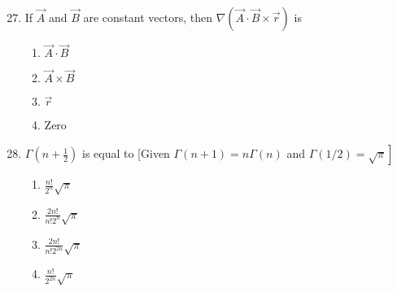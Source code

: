 \documentclass[journal]{IEEEtran}
\begin{document}
\begin{enumerate}
		\setcounter{enumi}{26}

 
    \item If $\vec{A}$ and $\vec{B}$ are constant vectors, then $\nabla(\vec{A} \cdot \vec{B} \times \vec{r})$ is
   
   \begin{multicols}{4}
			\begin{enumerate}

\item $\vec{A} \cdot \vec{B}$
\item  $\vec{A} \times \vec{B}$
\item $\vec{r}$

\item Zero

        \end{enumerate}
		\end{multicols}
  \item  $\Gamma(n+\frac{1}{2})$ is equal to [Given $\Gamma(n+1)=n \Gamma(n)$ and $\left.\Gamma(1 / 2)=\sqrt{\pi}\right]$
   \begin{multicols}{4}
			\begin{enumerate}
\item  $\frac{n!}{2^{n}} \sqrt{\pi}$
\item $\frac{2 n!}{n!2^{n}} \sqrt{\pi}$
\item $\frac{2 n!}{n!2^{2 n}} \sqrt{\pi}$
\item $\frac{n!}{2^{2 n}} \sqrt{\pi}$

  \end{enumerate}
		\end{multicols}
  

\end{enumerate}
\end{document}
